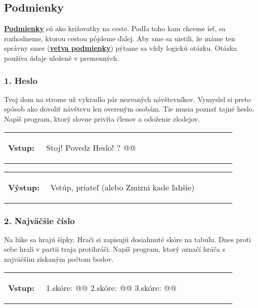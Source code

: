 \subsection{Podmienky}
\underline{\textbf{Podmienky}} sú ako križovatky na ceste. Podľa toho kam chceme ísť, sa rozhodneme, ktorou cestou pôjdeme ďalej. Aby sme sa uistili, že máme ten správny smer (\underline{\textbf{vetva podmienky}}) pýtame sa vždy logickú otázku. Otázka používa údaje uložené v premenných.

\subsubsection*{1. Heslo}
Tvoj dom na strome už vykradlo pár nezvaných návštevníkov. Vymyslel si preto spôsob ako dovoliť návštevu len overeným osobám. Tie musia poznať tajné heslo. Napíš program, ktorý slovne privíta členov a odoženie zlodejov.

\begin{tabular}{@{}p{0.15\linewidth}p{0.75\linewidth}}
\textbf{\small Vstup:} &
\vspace{-3em}
\begin{code}
Stoj! Povedz Heslo!
? @\fbox{\phantom{vstup}}@
\end{code}
\end{tabular}

\vspace{-2em}
\begin{tabular}{@{}p{0.15\linewidth}p{0.75\linewidth}}
\textbf{\small Výstup:} &
\vspace{-3em}
\begin{code}
Vstúp, priateľ 
(alebo Zmizni kade ľahšie)
\end{code}
\end{tabular}
\vspace{-2em}

\subsubsection*{2. Najväčšie číslo}
Na lúke sa hrajú šípky. Hrači si zapisujú dosiahnuté skóre na tabuľu. Dnes proti sebe hrali v partii traja protihráči. Napíš program, ktorý označí hráča s najväčším získaným počtom bodov.

\begin{tabular}{@{}p{0.15\linewidth}p{0.75\linewidth}}
\textbf{\small Vstup:} &
\vspace{-3em}
\begin{code}
1.skóre: @\fbox{\phantom{vstup}}@
2.skóre: @\fbox{\phantom{vstup}}@
3.skóre: @\fbox{\phantom{vstup}}@
\end{code}
\end{tabular}

